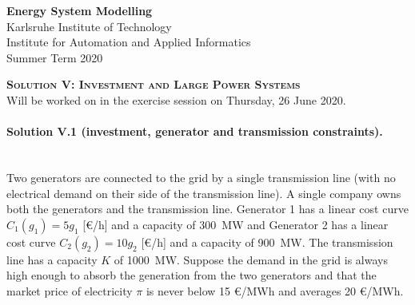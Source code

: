 \documentclass[11pt,a4paper,fleqn]{scrartcl}
\begin{document}
\begin{flushright}
  \textbf{Energy System Modelling }\\
  {\small Karlsruhe Institute of Technology}\\
  {\small Institute for Automation and Applied Informatics}\\
  {\small Summer Term 2020}\\
 \end{flushright}
 
  
  \vspace{-0.5em}
  \hrulefill
  \vspace{0.3em}
 
 \begin{center}
  \textbf{\textsc{\Large Solution V: Investment and Large Power Systems}}\\
  \small Will be worked on in the exercise session on Thursday, 26 June 2020.\\[1.5em]
 \end{center}
 
 \vspace{-0.5em}
 \hrulefill
 \vspace{0.8em}

\paragraph{Solution V.1 \normalsize (investment, generator and transmission constraints).}~\\

Two generators are connected to the grid by a single transmission
line (with no electrical demand on their side of the transmission line). A single company owns both the generators and the transmission line. Generator 1 has a linear cost curve $C_1(g_1) = 5 g_1$ [\euro/h] and a capacity of 300~MW and Generator 2 has a linear cost curve $C_2(g_2) = 10 g_2$ [\euro/h] and a capacity of 900~MW. The transmission line has a capacity $K$ of 1000~MW. Suppose the demand in the grid is always high enough to absorb the
generation from the two generators and that the market price of
electricity $\pi$ is never below 15 \euro/MWh and averages 20
\euro/MWh.
\end{document}
